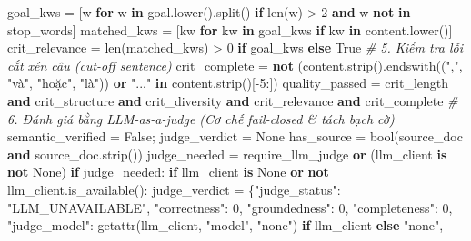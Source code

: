 \documentclass[]{article}
\newenvironment{Shaded}{}{}
\newcommand{\BuiltInTok}[1]{#1}
\newcommand{\CommentTok}[1]{\textcolor[rgb]{0.38,0.63,0.69}{\textit{#1}}}
\newcommand{\ConstantTok}[1]{\textcolor[rgb]{0.53,0.00,0.00}{#1}}
\newcommand{\ControlFlowTok}[1]{\textcolor[rgb]{0.00,0.44,0.13}{\textbf{#1}}}
\newcommand{\DecValTok}[1]{\textcolor[rgb]{0.25,0.63,0.44}{#1}}
\newcommand{\KeywordTok}[1]{\textcolor[rgb]{0.00,0.44,0.13}{\textbf{#1}}}
\newcommand{\NormalTok}[1]{#1}
\newcommand{\OperatorTok}[1]{\textcolor[rgb]{0.40,0.40,0.40}{#1}}
\newcommand{\StringTok}[1]{\textcolor[rgb]{0.25,0.44,0.63}{#1}}
\newcommand{\VariableTok}[1]{\textcolor[rgb]{0.10,0.09,0.49}{#1}}
\begin{document}
\begin{Shaded}
\begin{Highlighting}[]
\NormalTok{        goal_kws }\OperatorTok{=}\NormalTok{ [w }\ControlFlowTok{for}\NormalTok{ w }\KeywordTok{in}\NormalTok{ goal.lower().split() }\ControlFlowTok{if} \BuiltInTok{len}\NormalTok{(w) }\OperatorTok{>} \DecValTok{2} \KeywordTok{and}\NormalTok{ w }\KeywordTok{not} \KeywordTok{in}\NormalTok{ stop_words]}
\NormalTok{        matched_kws }\OperatorTok{=}\NormalTok{ [kw }\ControlFlowTok{for}\NormalTok{ kw }\KeywordTok{in}\NormalTok{ goal_kws }\ControlFlowTok{if}\NormalTok{ kw }\KeywordTok{in}\NormalTok{ content.lower()]}
\NormalTok{        crit_relevance }\OperatorTok{=} \BuiltInTok{len}\NormalTok{(matched_kws) }\OperatorTok{>} \DecValTok{0} \ControlFlowTok{if}\NormalTok{ goal_kws }\ControlFlowTok{else} \ConstantTok{True}
\NormalTok{        }\CommentTok{# 5. Kiểm tra lỗi cắt xén câu (cut-off sentence)}
\NormalTok{        crit_complete }\OperatorTok{=} \KeywordTok{not}\NormalTok{ (content.strip().endswith((}\StringTok{","}\NormalTok{, }\StringTok{"và"}\NormalTok{, }\StringTok{"hoặc"}\NormalTok{, }\StringTok{"là"}\NormalTok{)) }\KeywordTok{or} \StringTok{"..."} \KeywordTok{in}\NormalTok{ content.strip()[}\OperatorTok{-}\DecValTok{5}\NormalTok{:])}
\NormalTok{        quality_passed }\OperatorTok{=}\NormalTok{ crit_length }\KeywordTok{and}\NormalTok{ crit_structure }\KeywordTok{and}\NormalTok{ crit_diversity }\KeywordTok{and}\NormalTok{ crit_relevance }\KeywordTok{and}\NormalTok{ crit_complete}
\NormalTok{        }\CommentTok{# 6. Đánh giá bằng LLM-as-a-judge (Cơ chế fail-closed \& tách bạch cờ)}
\NormalTok{        semantic_verified }\OperatorTok{=} \ConstantTok{False}\NormalTok{; judge_verdict }\OperatorTok{=} \VariableTok{None}
\NormalTok{        has_source }\OperatorTok{=} \BuiltInTok{bool}\NormalTok{(source_doc }\KeywordTok{and}\NormalTok{ source_doc.strip())}
\NormalTok{        judge_needed }\OperatorTok{=}\NormalTok{ require_llm_judge }\KeywordTok{or}\NormalTok{ (llm_client }\KeywordTok{is not}\NormalTok{ }\VariableTok{None}\NormalTok{)}
\NormalTok{        }\ControlFlowTok{if}\NormalTok{ judge_needed:}
\NormalTok{            }\ControlFlowTok{if}\NormalTok{ llm_client }\KeywordTok{is}\NormalTok{ }\VariableTok{None} \KeywordTok{or} \KeywordTok{not}\NormalTok{ llm_client.is_available():}
\NormalTok{                judge_verdict }\OperatorTok{=}\NormalTok{ \{}\StringTok{"judge_status"}\NormalTok{: }\StringTok{"LLM_UNAVAILABLE"}\NormalTok{, }\StringTok{"correctness"}\NormalTok{: }\DecValTok{0}\NormalTok{, }\StringTok{"groundedness"}\NormalTok{: }\DecValTok{0}\NormalTok{, }\StringTok{"completeness"}\NormalTok{: }\DecValTok{0}\NormalTok{,}
\NormalTok{                                 }\StringTok{"judge_model"}\NormalTok{: }\BuiltInTok{getattr}\NormalTok{(llm_client, }\StringTok{"model"}\NormalTok{, }\StringTok{"none"}\NormalTok{) }\ControlFlowTok{if}\NormalTok{ llm_client }\ControlFlowTok{else} \StringTok{"none"}\NormalTok{,}

\end{Highlighting}
\end{Shaded}
\end{document}
